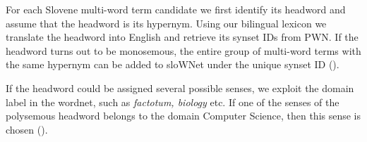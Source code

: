 \documentclass[output=paper]{LSP/langsci}
\begin{document}
For each Slovene multi-word term candidate we first identify its headword and assume that the headword is its hypernym. Using our bilingual lexicon we translate the headword into English and retrieve its synset IDs from PWN. If the headword turns out to be monosemous, the entire group of multi-word terms with the same hypernym can be added to sloWNet under the unique synset ID ().


\begin{table}
\caption{Monosemous headword}
\label{tab:vintar:5}
\end{table}

If the headword could be assigned several possible senses, we exploit the domain label in the wordnet, such as \textit{factotum, biology} etc. If one of the senses of the polysemous headword belongs to the domain Computer Science, then this sense is chosen ().
\end{document}
